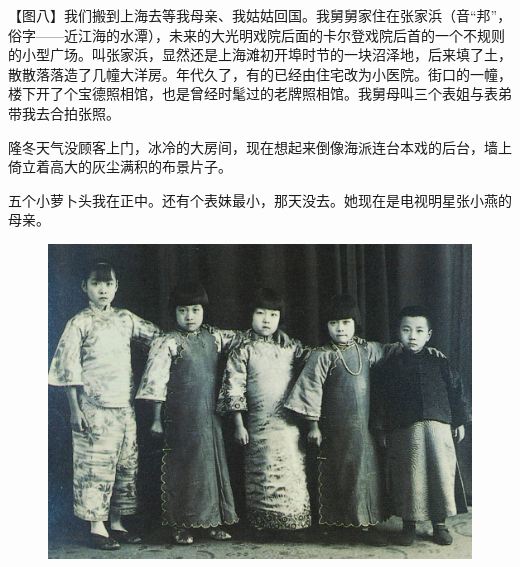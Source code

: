 \clearpage
\par 【图八】我们搬到上海去等我母亲、我姑姑回国。我舅舅家住在张家浜（音“邦”，俗字——近江海的水潭），未来的大光明戏院后面的卡尔登戏院后首的一个不规则的小型广场。叫张家浜，显然还是上海滩初开埠时节的一块沼泽地，后来填了土，散散落落造了几幢大洋房。年代久了，有的已经由住宅改为小医院。街口的一幢，楼下开了个宝德照相馆，也是曾经时髦过的老牌照相馆。我舅母叫三个表姐与表弟带我去合拍张照。
\par 隆冬天气没顾客上门，冰冷的大房间，现在想起来倒像海派连台本戏的后台，墙上倚立着高大的灰尘满积的布景片子。
\par 五个小萝卜头我在正中。还有个表妹最小，那天没去。她现在是电视明星张小燕的母亲。
\begin{figure}[htb]
    \centering %
    \includegraphics[scale=0.4]{picture/对照记8.jpeg}
\end{figure}

